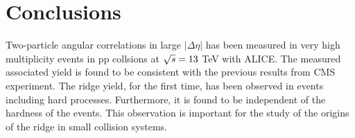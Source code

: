\section{Conclusions}

Two-particle angular correlations in large $|\Delta\eta|$ has been measured in very high multiplicity events in pp collsions at $\sqrt{\it{s}}=13$ TeV with ALICE. The measured associated yield is found to be consistent with the previous results from CMS experiment. The ridge yield, for the first time, has been observed in events including hard processes. Furthermore, it is found to be independent of the hardness of the events. This observation is important for the study of the origins of the ridge in small collision systems.

